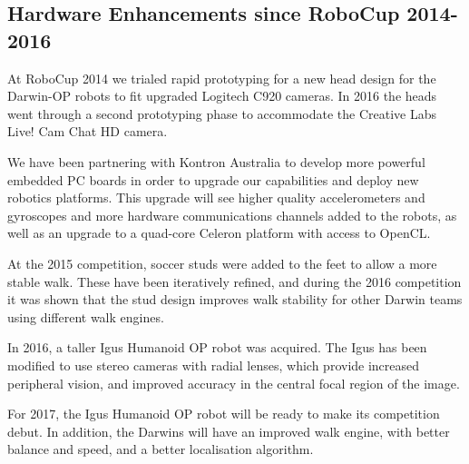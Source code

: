 \documentclass{llncs}
\begin{document}

\subsection{Hardware Enhancements since RoboCup 2014-2016}
At RoboCup 2014 we trialed rapid prototyping for a new head design for the Darwin-OP robots to fit upgraded Logitech C920 cameras. In 2016 the heads went through a second prototyping phase to accommodate the Creative Labs Live! Cam Chat HD camera. %

We have been partnering with Kontron Australia to develop more powerful embedded PC boards in order to upgrade our capabilities and deploy new robotics platforms. This upgrade will see higher quality accelerometers and gyroscopes and more hardware communications channels added to the robots, as well as an upgrade to a quad-core Celeron platform with access to OpenCL.

At the 2015 competition, soccer studs were added to the feet to allow a more stable walk. These have been iteratively refined, and during the 2016 competition it was shown that the stud design improves walk stability for other Darwin teams using different walk engines.

In 2016, a taller Igus Humanoid OP robot was acquired. The Igus has been modified to use stereo cameras with radial lenses, which provide increased peripheral vision, and improved accuracy in the central focal region of the image.

For 2017, the Igus Humanoid OP robot will be ready to make its competition debut. In addition, the Darwins will have an improved walk engine, with better balance and speed,  and a better localisation algorithm.


\end{document}
